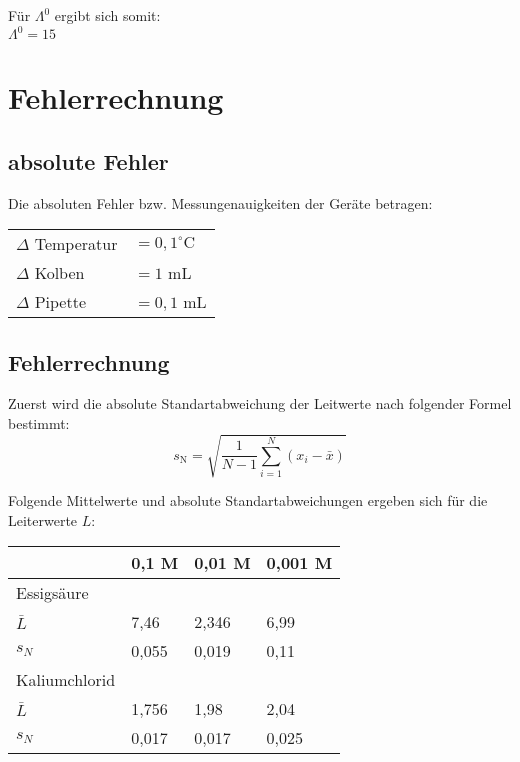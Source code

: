 \documentclass[12pt,a4paper,titlepage,headinclude,bibtotoc]{scrartcl}
\begin{document}
Für $\Lambda^0$ ergibt sich somit:\\
$\Lambda^0 = 15$\\

\section{Fehlerrechnung}

\subsection{absolute Fehler}
Die absoluten Fehler bzw. Messungenauigkeiten der Geräte betragen:\\

\begin{table} [h]
\centering 
\begin{tabular}{p{4cm}p{4cm}}
$\Delta$ Temperatur & $= 0,1^\circ\text{C}$ \\
$\Delta$ Kolben &$= 1$ mL   \\
$\Delta$ Pipette &  $=0,1$ mL \\
\end{tabular}
\end{table}





\subsection{Fehlerrechnung}
Zuerst wird die absolute Standartabweichung der Leitwerte nach folgender Formel bestimmt:\\

\begin{equation}
s_{\mathrm{N}} = \sqrt{\frac{1}{N-1} \sum_{i=1}^{N}(x_i -\bar{x})}
\end{equation} 

Folgende Mittelwerte und absolute Standartabweichungen ergeben sich für die Leiterwerte $L$:\\

\begin{table} [h]
\centering 
\begin{tabular}{|p{4cm}||p{2cm}|p{2cm}|p{2cm}|}
\hline
& 0,1 M & 0,01 M & 0,001 M \\
\hline
Essigsäure & & & \\
 $\bar{L}$ &7,46 & 2,346 & 6,99\\
$s_N$ & 0,055 & 0,019 & 0,11 \\
\hline
Kaliumchlorid & & &\\
$\bar{L}$ & 1,756 & 1,98 & 2,04\\
$s_N$& 0,017 & 0,017 & 0,025\\
\hline
\end{tabular}
\end{table}
\end{document}
